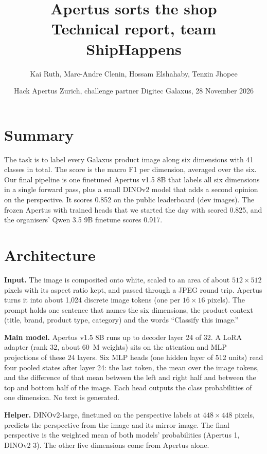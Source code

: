 \documentclass[10pt,a4paper]{article}
\title{\vspace{-1.5cm}Apertus sorts the shop\\[2pt]\large Technical report, team ShipHappens}
\author{Kai Ruth, Marc-Andre Clenin, Hossam Elshahaby, Tenzin Jhopee}
\date{Hack Apertus Zurich, challenge partner Digitec Galaxus, 28 November 2026}
\begin{document}
\maketitle
\vspace{-0.8cm}

\section{Summary}

The task is to label every Galaxus product image along six dimensions with 41 classes in total. The score is the
macro F1 per dimension, averaged over the six. Our final pipeline is one finetuned Apertus v1.5 8B that labels all
six dimensions in a single forward pass, plus a small DINOv2 model that adds a second opinion on the perspective.
It scores 0.852 on the public leaderboard (dev images). The frozen Apertus with trained heads that we started the
day with scored 0.825, and the organisers' Qwen 3.5 9B finetune scores 0.917.

\section{Architecture}

\textbf{Input.} The image is composited onto white, scaled to an area of about $512\times512$ pixels with its aspect
ratio kept, and passed through a JPEG round trip. Apertus turns it into about 1{,}024 discrete image tokens (one per
$16\times16$ pixels). The prompt holds one sentence that names the six dimensions, the product context (title,
brand, product type, category) and the words ``Classify this image.''

\textbf{Main model.} Apertus v1.5 8B runs up to decoder layer 24 of 32. A LoRA adapter (rank 32, about 60~M weights)
sits on the attention and MLP projections of these 24 layers. Six MLP heads (one hidden layer of 512 units) read
four pooled states after layer 24: the last token, the mean over the image tokens, and the difference of that mean
between the left and right half and between the top and bottom half of the image. Each head outputs the class
probabilities of one dimension. No text is generated.

\textbf{Helper.} DINOv2-large, finetuned on the perspective labels at $448\times448$ pixels, predicts the
perspective from the image and its mirror image. The final perspective is the weighted mean of both models'
probabilities (Apertus 1, DINOv2 3). The other five dimensions come from Apertus alone.
\end{document}
